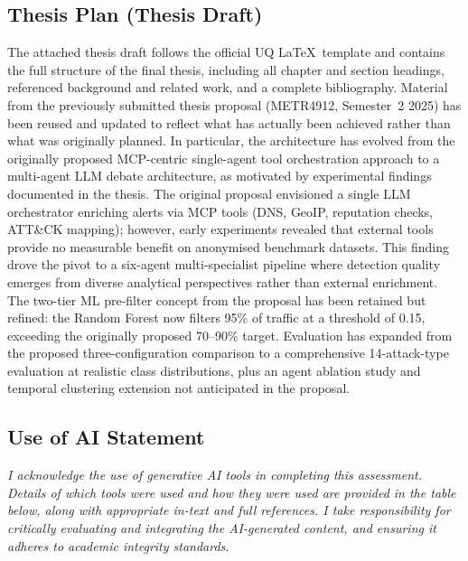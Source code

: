 \documentclass[12pt,openany,oneside,a4paper]{book}
\begin{document}
\subsection*{Thesis Plan (Thesis Draft)}
The attached thesis draft follows the official UQ \LaTeX\ template and contains the full structure of the final thesis, including all chapter and section headings, referenced background and related work, and a complete bibliography. Material from the previously submitted thesis proposal (METR4912, Semester~2 2025) has been reused and updated to reflect what has actually been achieved rather than what was originally planned. In particular, the architecture has evolved from the originally proposed MCP-centric single-agent tool orchestration approach to a multi-agent LLM debate architecture, as motivated by experimental findings documented in the thesis. The original proposal envisioned a single LLM orchestrator enriching alerts via MCP tools (DNS, GeoIP, reputation checks, ATT\&CK mapping); however, early experiments revealed that external tools provide no measurable benefit on anonymised benchmark datasets. This finding drove the pivot to a six-agent multi-specialist pipeline where detection quality emerges from diverse analytical perspectives rather than external enrichment. The two-tier ML pre-filter concept from the proposal has been retained but refined: the Random Forest now filters 95\% of traffic at a threshold of 0.15, exceeding the originally proposed 70--90\% target. Evaluation has expanded from the proposed three-configuration comparison to a comprehensive 14-attack-type evaluation at realistic class distributions, plus an agent ablation study and temporal clustering extension not anticipated in the proposal.

\subsection*{Use of AI Statement}
\textit{I acknowledge the use of generative AI tools in completing this assessment. Details of which tools were used and how they were used are provided in the table below, along with appropriate in-text and full references. I take responsibility for critically evaluating and integrating the AI-generated content, and ensuring it adheres to academic integrity standards.}
\end{document}
